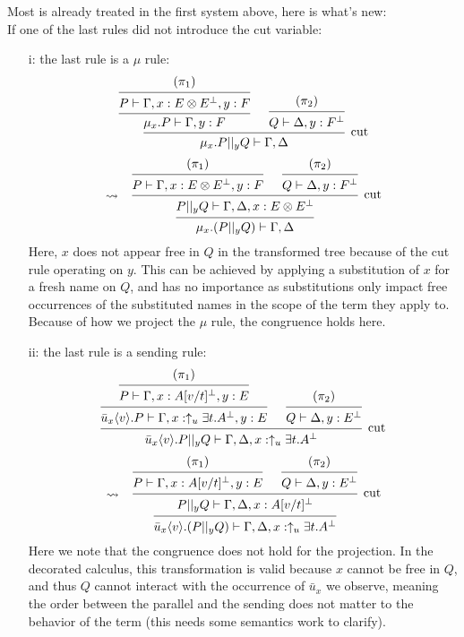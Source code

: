 \documentclass[a4paper,12pt]{article}
\begin{document}
\begin{myproof}
Most is already treated in the first system above, here is what's new:\\
If one of the last rules did not introduce the cut variable:
\begin{itemize}
	\item[i:] the last rule is a $\mu$ rule:
		\[
			\begin{prooftree}
						\hypo{(\pi_1)}
					\infer1{P \vdash \Gamma,x:E\logtensor E^\bot,y:F}
				\infer1{\mu_x.P \vdash \Gamma,y:F}
					\hypo{(\pi_2)}
				\infer1{Q \vdash \Delta,y:F^\bot}
			\infer2[cut]{\mu_x.P ||_y Q \vdash \Gamma,\Delta}
			\end{prooftree}
		\]\[
			\leadsto\;\;\;
			\begin{prooftree}
						\hypo{(\pi_1)}
					\infer1{P \vdash \Gamma,x:E\logtensor E^\bot,y:F}
						\hypo{(\pi_2)}
					\infer1{Q \vdash \Delta,y:F^\bot}
				\infer2[cut]{P ||_y Q \vdash \Gamma,\Delta,x:E\logtensor E^\bot}
			\infer1{\mu_x.(P ||_y Q) \vdash \Gamma,\Delta}
			\end{prooftree}
		\]
		Here, $x$ does not appear free in $Q$ in the transformed tree because of the cut rule operating on $y$. This can be achieved by applying a substitution of $x$ for a fresh name on $Q$, and has no importance as substitutions only impact free occurrences of the substituted names in the scope of the term they apply to.\\
		Because of how we project the $\mu$ rule, the congruence holds here.
	\item[ii:] the last rule is a sending rule:
		\[
			\begin{prooftree}
						\hypo{(\pi_1)}
					\infer1{P \vdash \Gamma,x:A[v/t]^\bot,y:E}
				\infer1{\bar{u}_x\langle v\rangle.P \vdash \Gamma,x:\uparrow_u\exists t.A^\bot,y:E}
					\hypo{(\pi_2)}
				\infer1{Q \vdash \Delta,y:E^\bot}
			\infer2[cut]{\bar{u}_x\langle v\rangle.P ||_y Q \vdash \Gamma,\Delta,x:\uparrow_u\exists t.A^\bot}
			\end{prooftree}
		\]\[
			\leadsto\;\;\;
			\begin{prooftree}
						\hypo{(\pi_1)}
					\infer1{P \vdash \Gamma,x:A[v/t]^\bot,y:E}
						\hypo{(\pi_2)}
					\infer1{Q \vdash \Delta,y:E^\bot}
				\infer2[cut]{P||_yQ \vdash \Gamma,\Delta,x:A[v/t]^\bot}
			\infer1{\bar{u}_x\langle v\rangle.(P||_yQ) \vdash \Gamma,\Delta,x:\uparrow_u\exists t.A^\bot}
			\end{prooftree}
		\]
		Here we note that the congruence does not hold for the projection. In the decorated calculus, this transformation is valid because $x$ cannot be free in $Q$, and thus $Q$ cannot interact with the occurrence of $\bar{u}_x$ we observe, meaning the order between the parallel and the sending does not matter to the behavior of the term (this needs some semantics work to clarify). %

\end{itemize}
\end{myproof}
\end{document}
